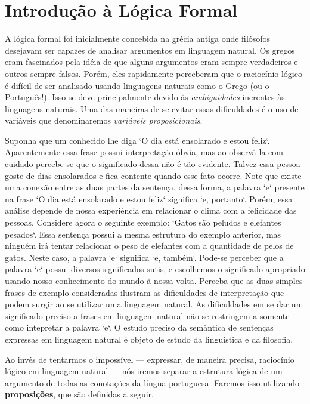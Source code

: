 \section{Introdu\c{c}\~ao \`a L\'ogica Formal}\label{cap1:sec1}

A l\'ogica formal foi inicialmente concebida na gr\'ecia antiga onde fil\'osofos desejavam ser capazes de analisar argumentos
em linguagem natural. Os gregos eram fascinados pela id\'eia de que alguns argumentos eram sempre verdadeiros e outros sempre
falsos. Por\'em, eles rapidamente perceberam que o racioc\'inio l\'ogico \'e dif\'icil de ser analisado usando linguagens naturais
como o Grego (ou o Portugu\^es!). Isso se deve principalmente devido \`as \emph{ambiguidades} inerentes \`as linguagens naturais.
Uma das maneiras de se evitar essas dificuldades \'e o uso de vari\'aveis que denominaremos \emph{vari\'aveis proposicionais}.

Suponha que um conhecido lhe diga `O dia est\'a ensolarado e estou feliz`. Aparentemente essa frase possui interpreta\c{c}\~ao
\'obvia, mas ao observ\'a-la com cuidado percebe-se que o significado dessa n\~ao \'e t\~ao evidente. Talvez essa pessoa goste
de dias ensolarados e fica contente quando esse fato ocorre. Note que existe uma conex\~ao entre as duas partes da senten\c{c}a,
dessa forma, a palavra `e` presente na frase `O dia est\'a ensolarado e estou feliz` significa `e, portanto`. Por\'em, essa an\'alise
depende de nossa experi\^encia em relacionar o clima com a felicidade das pessoas. Considere agora o seguinte exemplo:
`Gatos s\~ao peludos e elefantes pesados`. Essa senten\c{c}a possui a mesma estrutura do exemplo anterior, mas ningu\'em ir\'a tentar
relacionar o peso de elefantes com a quantidade de pelos de gatos. Neste caso, a palavra `e` significa `e, tamb\'em`. Pode-se perceber que a
palavra `e` possui diversos significados sutis, e escolhemos o significado apropriado usando nosso conhecimento do mundo \`a nossa volta.
Perceba que as duas simples frases de exemplo consideradas ilustram as dificuldades de interpreta\c{c}\~ao que podem surgir ao se utilizar
uma linguagem natural. As dificuldades em se dar um significado preciso a frases em linguagem natural n\~ao se restringem a somente como
intepretar a palavra `e`. O estudo preciso da sem\^antica de senten\c{c}as expressas em linguagem natural \'e objeto de estudo da lingu\'istica
e da filosofia.

Ao inv\'es de tentarmos o imposs\'ivel --- expressar, de maneira precisa,  racioc\'inio l\'ogico em linguagem natural  --- n\'os iremos separar
a estrutura l\'ogica de um argumento de todas as conota\c{c}\~oes da l\'ingua portuguesa. Faremos isso utilizando \textbf{proposi\c{c}\~oes}, que
s\~ao definidas a seguir.

